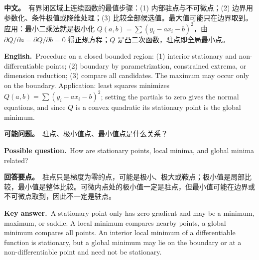 \documentclass[UTF8,11pt,a4paper]{ctexart}
\newcommand{\BOTH}[2]{\par\noindent\textbf{中文。}\ #1\par\noindent\textbf{English.}\ #2\par}
\newcommand{\ASK}[4]{\begin{samepage}\par\noindent\textbf{可能问题。}\ #1\par\noindent\textbf{Possible question.}\ #2\par\noindent\textbf{回答要点。}\ #3\par\noindent\textbf{Key answer.}\ #4\medskip\end{samepage}}
\begin{document}
\BOTH{有界闭区域上连续函数的最值步骤：(1) 内部驻点与不可微点；(2) 边界用参数化、条件极值或降维处理；(3) 比较全部候选值。最大值可能只在边界取到。应用：最小二乘法就是极小化 $Q(a,b)=\sum(y_i-ax_i-b)^2$，由 $\partial Q/\partial a=\partial Q/\partial b=0$ 得正规方程；$Q$ 是凸二次函数，驻点即全局最小点。}{Procedure on a closed bounded region: (1) interior stationary and non-differentiable points; (2) boundary by parametrization, constrained extrema, or dimension reduction; (3) compare all candidates. The maximum may occur only on the boundary. Application: least squares minimizes $Q(a,b)=\sum(y_i-ax_i-b)^2$; setting the partials to zero gives the normal equations, and since $Q$ is a convex quadratic its stationary point is the global minimum.}
\ASK{驻点、极小值点、最小值点是什么关系？}{How are stationary points, local minima, and global minima related?}{驻点只是梯度为零的点，可能是极小、极大或鞍点；极小值是局部比较，最小值是整体比较。可微内点处的极小值一定是驻点，但最小值可能在边界或不可微点取到，因此不一定是驻点。}{A stationary point only has zero gradient and may be a minimum, maximum, or saddle. A local minimum compares nearby points, a global minimum compares all points. An interior local minimum of a differentiable function is stationary, but a global minimum may lie on the boundary or at a non-differentiable point and need not be stationary.}
\end{document}
